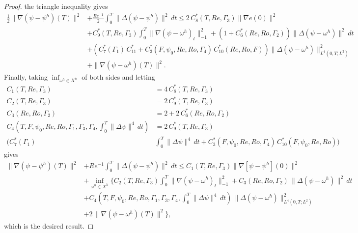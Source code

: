 \begin{proof}
  the triangle inequality gives
  \begin{align*}
    \frac{1}{2} \|\nabla \left( \psi - \psi^h\right)(T) \|^2
    &+ \frac{Re^{-1}}{2} \int_0^T\! \|\Delta \left(\psi - \psi^h\right)\|^2\, dt
      \le 2\,C^*_8(T,Re,\Gamma_3) \|\nabla e(0)\|^2 \\
    & + C^*_9(T,Re,\Gamma_3) \int_0^T\! \|\nabla \left( \psi - \omega^h\right)_t\|_{-1}^2
      + \left(1 + C^*_6(Re,Ro,\Gamma_2)\right)
      \|\Delta \left(\psi - \omega^h\right)\|^2\, dt \\
    & + \left(C^*_7(\Gamma_1)\, C^*_{11}
      + C^*_3(F,\psi_0,Re,Ro,\Gamma_4)\,C^*_{10}(Re,Ro,F)\right)
      \|\Delta \left(\psi - \omega^h\right)\|^2_{L^4(0,T;L^2)} \\
    & + \|\nabla \left(\psi - \omega^h\right)(T)\|^2.
  \end{align*}
  Finally, taking $\inf_{\omega^h \in X^h}$ of both sides and letting
  \begin{align*}
    C_1(T,Re,\Gamma_3) &= 4\, C^*_8(T,Re,\Gamma_3) \\
    C_2(T,Re,\Gamma_3) &= 2\, C^*_9(T,Re,\Gamma_3) \\
    C_3(Re,Ro,\Gamma_2) &= 2 + 2\,C^*_6(Re,Ro,\Gamma_2) \\
    C_4(T,F,\psi_0,Re,Ro,\Gamma_1,\Gamma_3,\Gamma_4,
      \int_{0}^{T}\!\|\Delta \psi\|^4\, dt) &= 2\, C^*_9(T,Re,\Gamma_3) \\
       \biggl(C^*_7(\Gamma_1)\, &\int_{0}^{T}\!\|\Delta \psi\|^4\,dt
      + C^*_3(F,\psi_0,Re,Ro,\Gamma_4)\, C^*_{10}(F,\psi_0,Re,Ro)\biggr)
  \end{align*}
  gives
  \begin{align*}
    \|\nabla \left( \psi - \psi^h\right)(T) \|^2
      &+ Re^{-1} \int_0^T\! \|\Delta \left(\psi - \psi^h\right)\|^2\, dt
      \le C_1(T,Re,\Gamma_3)\|\nabla\left[\psi - \psi^h\right](0)\|^2 \\
    & + \inf_{\omega^h \in X^h} \biggl\{C_2(T,Re,\Gamma_3)
      \int_0^T\! \|\nabla \left( \psi - \omega^h\right)_t\|_{-1}^2
      + C_3(Re,Ro,\Gamma_2)\,\|\Delta \left(\psi - \omega^h\right)\|^2\, dt \\
    & + C_4(T,F,\psi_0,Re,Ro,\Gamma_1,\Gamma_3,\Gamma_4,\int_{0}^{T}\!\|\Delta
      \psi\|^4\, dt)\, \|\Delta \left(\psi - \omega^h\right)\|^2_{L^4(0,T;L^2)} \\
    & + 2\, \|\nabla \left(\psi - \omega^h\right)(T)\|^2\biggr\},
  \end{align*}
  which is the desired result.
\end{proof}

